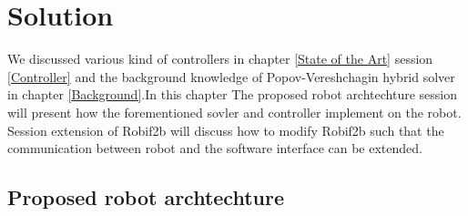 \documentclass[report.tex]{subfiles}
\begin{document}
    \chapter{Solution}
    We discussed various kind of controllers in chapter \ref{State of the Art} session \ref{Controller} and the background knowledge of Popov-Vereshchagin hybrid solver in chapter \ref{Background}.In this chapter The proposed robot archtechture session will present how the forementioned sovler and controller implement on the robot. Session extension of Robif2b will discuss how to modify Robif2b such that the communication between robot and the software interface can be extended.

    \section{Proposed robot archtechture}
\end{document}
